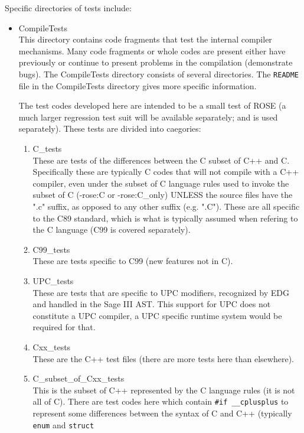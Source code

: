 Specific directories of tests include:
\begin{itemize}

   \item CompileTests \\
   This directory contains code fragments that test the internal compiler mechanisms.
Many code fragments or whole codes are present either have previously or continue to present
problems in the compilation (demonstrate bugs).  The CompileTests directory consists of several directories.
The {\tt README} file in the CompileTests directory gives more specific information.

The test codes developed here are intended to be a small test of ROSE (a much larger
regression test suit will be available separately; and is used separately).
These tests are divided into caegories:
\begin{enumerate}
   \item C\_tests \\
      These are tests of the differences between the C subset of C++ and C. Specifically
      these are typically C codes that will not compile with a C++ compiler, even under the 
      subset of C language rules used to invoke the subset of C (-rose:C or -rose:C\_only)
      UNLESS the source files have the ".c" suffix, as opposed to any other suffix
      (e.g. ".C"). These are all specific to the C89 standard, which is what is typically 
      assumed when refering to the C language (C99 is covered separately).
   \item C99\_tests \\
      These are tests specific to C99 (new features not in C).
   \item UPC\_tests \\
      These are tests that are specific to UPC modifiers, recognized by EDG and handled
      in the Sage III AST.  This support for UPC does not constitute a UPC compiler, a 
      UPC specific runtime system would be required for that.
   \item Cxx\_tests \\
      These are the C++ test files (there are more tests here than elsewhere).
   \item C\_subset\_of\_Cxx\_tests \\
      This is the subset of C++ represented by the C language rules (it is not all of C).
      There are test codes here which contain {\tt \#if \_\_cplusplus} to represent some
      differences between the syntax of C and C++ (typically {\tt enum} and {\tt struct}

\end{enumerate}
\end{itemize}
